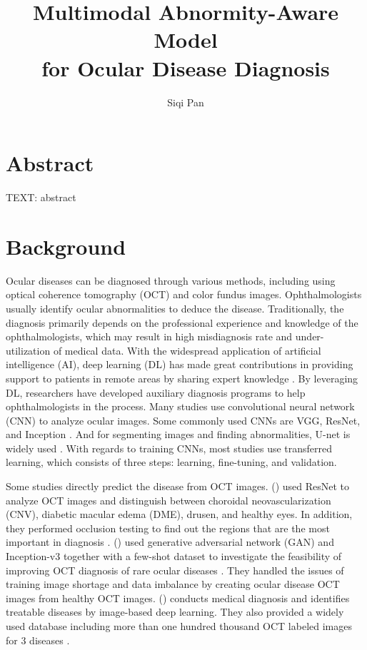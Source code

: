 \documentclass{article}
\newcommand{\authyear}[1]{\citeauthor{#1} (\citeyear{#1})}
\begin{document}
	\title{\vspace{-2.25cm} Multimodal Abnormity-Aware Model\\for Ocular Disease Diagnosis}
	\author{Siqi Pan}
	\date{}
	\maketitle
	
	\section*{Abstract}
	
	TEXT: abstract
	
	\section{Background}
	Ocular diseases can be diagnosed through various methods, including using optical coherence tomography (OCT) and color fundus images. Ophthalmologists usually identify ocular abnormalities to deduce the disease. Traditionally, the diagnosis primarily depends on the professional experience and knowledge of the ophthalmologists, which may result in high misdiagnosis rate and under-utilization of medical data. With the widespread application of artificial intelligence (AI), deep learning (DL) has made great contributions in providing support to patients in remote areas by sharing expert knowledge \autocite{Ichhpujani_Thakur_2021}. By leveraging DL, researchers have developed auxiliary diagnosis programs to help ophthalmologists in the process. Many studies use convolutional neural network (CNN) to analyze ocular images. Some commonly used CNNs are VGG, ResNet, and Inception \autocite{daich2023artificial}. And for segmenting images and finding abnormalities, U-net is widely used \autocite{Ronneberger_Fischer_Brox_2015}. With regards to training CNNs, most studies use transferred learning, which consists of three steps: learning, fine-tuning, and validation.
	
	Some studies directly predict the disease from OCT images.
	\authyear{li2019deep} used ResNet to analyze OCT images and distinguish between choroidal neovascularization (CNV), diabetic macular edema (DME), drusen, and healthy eyes. In addition, they performed occlusion testing to find out the regions that are the most important in diagnosis \autocite{li2019deep}. 
	\authyear{yoo2021feasibility} used generative adversarial network (GAN) and Inception-v3 together with a few-shot dataset to investigate the feasibility of improving OCT diagnosis of rare ocular diseases \autocite{yoo2021feasibility}. They handled the issues of training image shortage and data imbalance by creating ocular disease OCT images from healthy OCT images. \authyear{Kermany2018} conducts medical diagnosis and identifies treatable diseases by image-based deep learning. They also provided a widely used database including more than one hundred thousand OCT labeled images for 3 diseases \autocite{Kermany2018}.
	
\end{document}

